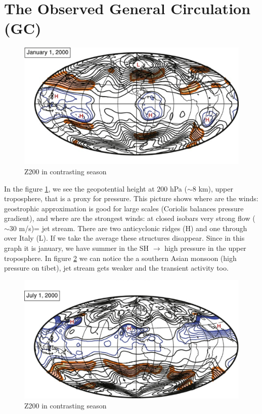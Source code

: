 \section{The Observed General Circulation (GC)}
\begin{figure}[htp]
    \centering
    \includegraphics[width=0.5\linewidth]{uploads/geopot height.png}
    \caption{Z200 in contrasting season}
    \label{fig:geopot height}
\end{figure}
In the figure \ref{fig:geopot height}, we see the geopotential height at $200$ hPa ($\sim 8$ km), upper troposphere, that is a proxy for pressure. This picture shows where are the winds: geostrophic approximation is good for large scales (Coriolis balances pressure gradient), and where are the strongest winds: at closed isobars very strong flow ($\sim 30$ m/s)= jet stream. There are two anticyclonic ridges (H) and one through over Italy (L). If we take the average these structures disappear. Since in this graph it is january, we have summer in the SH $\rightarrow$ high pressure in the upper troposphere. 
In figure \ref{fig:summer} we can notice the a southern Asian monsoon (high pressure on tibet), jet stream gets weaker and the transient activity too. 
\begin{figure}[htp]
    \centering
    \includegraphics[width=0.5\linewidth]{uploads/summer.png}
    \caption{Z200 in contrasting season}
    \label{fig:summer}
\end{figure}


